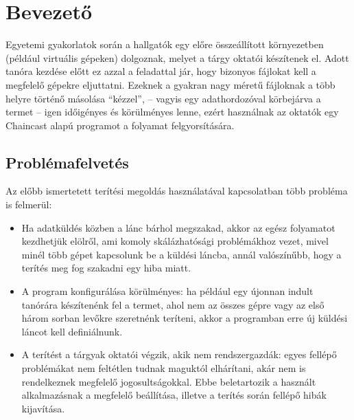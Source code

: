 \chapter{Bevezető} 

Egyetemi gyakorlatok során a hallgatók egy előre összeállított környezetben (például virtuális
gépeken) dolgoznak, melyet a tárgy oktatói készítenek el. Adott tanóra kezdése előtt 
ez azzal a feladattal jár, hogy bizonyos fájlokat kell a megfelelő gépekre eljuttatni. Ezeknek a gyakran nagy méretű fájloknak a több helyre történő másolása ``kézzel'', -- vagyis egy adathordozóval körbejárva a termet -- igen időigényes és körülményes lenne, ezért használnak az oktatók egy Chaincast\cite{kiraly2011chaincast} alapú programot a folyamat felgyorsítására. 

\section{Problémafelvetés}

Az előbb ismertetett terítési megoldás használatával kapcsolatban több probléma is felmerül:

\begin{itemize}
  \item Ha adatküldés közben a lánc bárhol megszakad, akkor az egész folyamatot kezdhetjük elölről, ami komoly skálázhatósági problémákhoz vezet, mivel minél több gépet kapcsolunk be a küldési láncba, annál valószínűbb, hogy a terítés meg fog szakadni egy hiba miatt.
   \item A program konfigurálása körülményes: ha például egy újonnan indult tanórára készítenénk fel a termet, ahol nem az összes gépre vagy az első három sorban levőkre szeretnénk teríteni, akkor a programban erre új küldési láncot kell definiálnunk.
   \item A terítést a tárgyak oktatói végzik, akik nem rendszergazdák: egyes fellépő problémákat nem feltétlen tudnak maguktól elhárítani, akár nem is rendelkeznek megfelelő jogosultságokkal. Ebbe beletartozik a használt alkalmazásnak a megfelelő beállítása, illetve a terítés során fellépő hibák kijavítása.
\end{itemize}

